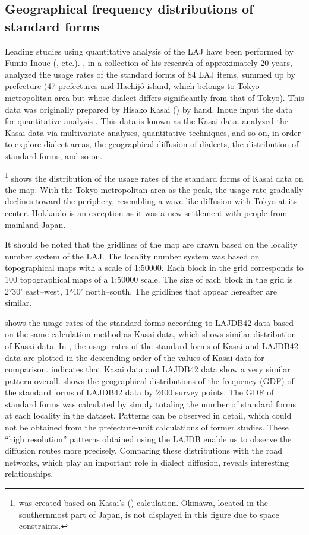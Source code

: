 \documentclass[output=paper]{LSP/langsci}
\begin{document}
\subsection{Geographical frequency distributions of standard forms}
Leading studies using quantitative analysis of the LAJ have been performed by Fumio Inoue (\citealt{inoue_keiryoteki_2001}, etc.). \citet{inoue_keiryoteki_2001}, in a collection of his research of approximately 20 years, analyzed the usage rates of the standard forms of 84 LAJ items, summed up by prefecture (47 prefectures and Hachijô island, which belongs to Tokyo metropolitan area but whose dialect differs significantly from that of Tokyo). This data was originally prepared by Hisako Kasai (\citeyear{kasai_hyojun_1981}) by hand. Inoue input the data for quantitative analysis \citep[89]{inoue_keiryoteki_2001}. This data is known as the Kasai data. \citet{inoue_keiryoteki_2001} analyzed the Kasai data via multivariate analyses, quantitative techniques, and so on, in order to explore dialect areas, the geographical diffusion of dialects, the distribution of standard forms, and so on.

\footnote{ was created based on Kasai’s (\citeyear{kasai_hyojun_1981}) calculation. Okinawa, located in the southernmost part of Japan, is not displayed in this figure due to space constraints.} shows the distribution of the usage rates of the standard forms of Kasai data on the map. With the Tokyo metropolitan area as the peak, the usage rate gradually declines toward the periphery, resembling a wave-like diffusion with Tokyo at its center. Hokkaido is an exception as it was a new settlement with people from mainland Japan.

It should be noted that the gridlines of the map are drawn based on the locality number system of the LAJ. The locality number system was based on topographical maps with a scale of 1:50000. Each block in the grid corresponds to 100 topographical maps of a 1:50000 scale. The size of each block in the grid is 2°30' east–west, 1°40' north–south. The gridlines that appear hereafter are similar.

 shows the usage rates of the standard forms according to LAJDB42 data based on the same calculation method as Kasai data, which shows similar distribution of Kasai data. In , the usage rates of the standard forms of Kasai and LAJDB42 data are plotted in the descending order of the values of Kasai data for comparison.  indicates that Kasai data and LAJDB42 data show a very similar pattern overall.  shows the geographical distributions of the frequency (GDF) of the standard forms of LAJDB42 data by 2400 survey points. The GDF of standard forms was calculated by simply totaling the number of standard forms at each locality in the dataset. Patterns can be observed in detail, which could not be obtained from the prefecture-unit calculations of former studies. These “high resolution” patterns obtained using the LAJDB enable us to observe the diffusion routes more precisely. Comparing these distributions with the road networks, which play an important role in dialect diffusion, reveals interesting relationships.
\end{document}

